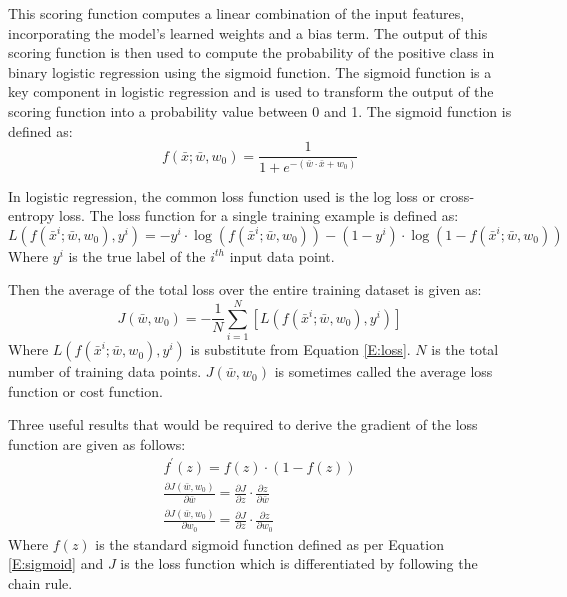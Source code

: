 \documentclass[12pt, a4paper, twoside]{article}
\begin{document}
This scoring function computes a linear combination of the input features, incorporating the model's learned weights and a bias term. The output of this scoring function is then used to compute the probability of the positive class in binary logistic regression using the sigmoid function. The sigmoid function is a key component in logistic regression and is used to transform the output of the scoring function into a probability value between 0 and 1. The sigmoid function is defined as:
\begin{equation}\label{E:sigmoid}
	f(\bar{x}; \bar{w}, w_0) = \frac{1}{1 + e^{-(\bar{w} \cdot \bar{x} + w_0)}}
\end{equation}

In logistic regression, the common loss function used is the log loss or cross-entropy loss. The loss function for a single training example is defined as:
\begin{equation}\label{E:loss}
	L(f(\bar{x}^i; \bar{w}, w_0), y^i) = -y^i \cdot \log (f(\bar{x}^i; \bar{w}, w_0)) - (1-y^i) \cdot \log (1 - f(\bar{x}^i; \bar{w}, w_0))
\end{equation}
Where $y^i$ is the true label of the $i^{th}$ input data point.

Then the average of the total loss over the entire training dataset is given as:
\begin{equation}
	J(\bar{w}, w_0) = - \frac{1}{N} \sum_{i = 1}^{N} \left[   L(f(\bar{x}^i; \bar{w}, w_0), y^i)    \right]
\end{equation}
Where $L(f(\bar{x}^i; \bar{w}, w_0), y^i)$ is substitute from Equation \ref{E:loss}. $N$ is the total number of training data points. $J(\bar{w}, w_0)$ is sometimes called the average loss function or cost function.

Three useful results that would be required to derive the gradient of the loss function are given as follows:
\begin{gather}
	f^{\prime}(z) = f(z) \cdot (1-f(z)) \label{E:fpz}\\
	\frac{\partial J(\bar{w}, w_0)}{\partial \bar{w}} = \frac{\partial J}{\partial z} \cdot \frac{\partial z}{\partial \bar{w}} \\
	\frac{\partial J(\bar{w}, w_0)}{\partial w_0} = \frac{\partial J}{\partial z} \cdot \frac{\partial z}{\partial w_0}
\end{gather}
Where $f(z)$ is the standard sigmoid function defined as per Equation \ref{E:sigmoid} and $J$ is the loss function which is differentiated by following the chain rule.
\end{document}
